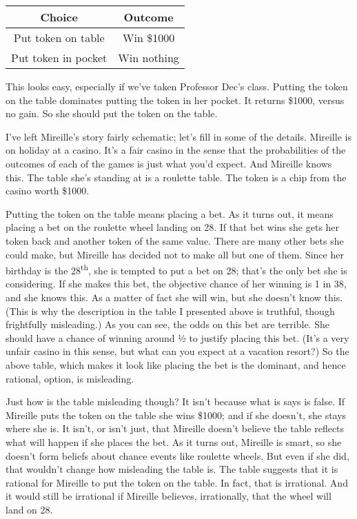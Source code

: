 \documentclass[
  11pt,
]{book}
\begin{document}
\begin{longtable}[]{@{}cc@{}}
\toprule\noalign{}
\textbf{Choice} & \textbf{Outcome} \\
\midrule\noalign{}
\endhead
\bottomrule\noalign{}
\endlastfoot
Put token on table & Win \$1000 \\
Put token in pocket & Win nothing \\
\end{longtable}

This looks easy, especially if we've taken Professor Dec's class. Putting the token on the table dominates putting the token in her pocket. It returns \$1000, versus no gain. So she should put the token on the table.

I've left Mireille's story fairly schematic; let's fill in some of the details. Mireille is on holiday at a casino. It's a fair casino in the sense that the probabilities of the outcomes of each of the games is just what you'd expect. And Mireille knows this. The table she's standing at is a roulette table. The token is a chip from the casino worth \$1000.

Putting the token on the table means placing a bet. As it turns out, it means placing a bet on the roulette wheel landing on 28. If that bet wins she gets her token back and another token of the same value. There are many other bets she could make, but Mireille has decided not to make all but one of them. Since her birthday is the 28\textsuperscript{th}, she is tempted to put a bet on 28; that's the only bet she is considering. If she makes this bet, the objective chance of her winning is 1 in 38, and she knows this. As a matter of fact she will win, but she doesn't know this. (This is why the description in the table I presented above is truthful, though frightfully misleading.) As you can see, the odds on this bet are terrible. She should have a chance of winning around ½ to justify placing this bet. (It's a very unfair casino in this sense, but what can you expect at a vacation resort?) So the above table, which makes it look like placing the bet is the dominant, and hence rational, option, is misleading.

Just how is the table misleading though? It isn't because what is says is false. If Mireille puts the token on the table she wins \$1000; and if she doesn't, she stays where she is. It isn't, or isn't just, that Mireille doesn't believe the table reflects what will happen if she places the bet. As it turns out, Mireille is smart, so she doesn't form beliefs about chance events like roulette wheels. But even if she did, that wouldn't change how misleading the table is. The table suggests that it is rational for Mireille to put the token on the table. In fact, that is irrational. And it would still be irrational if Mireille believes, irrationally, that the wheel will land on 28.
\end{document}

